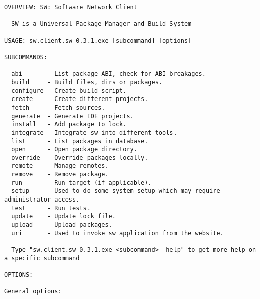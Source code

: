 \begin{verbatim}
OVERVIEW: SW: Software Network Client

  SW is a Universal Package Manager and Build System

USAGE: sw.client.sw-0.3.1.exe [subcommand] [options]

SUBCOMMANDS:

  abi       - List package ABI, check for ABI breakages.
  build     - Build files, dirs or packages.
  configure - Create build script.
  create    - Create different projects.
  fetch     - Fetch sources.
  generate  - Generate IDE projects.
  install   - Add package to lock.
  integrate - Integrate sw into different tools.
  list      - List packages in database.
  open      - Open package directory.
  override  - Override packages locally.
  remote    - Manage remotes.
  remove    - Remove package.
  run       - Run target (if applicable).
  setup     - Used to do some system setup which may require administrator access.
  test      - Run tests.
  update    - Update lock file.
  upload    - Upload packages.
  uri       - Used to invoke sw application from the website.

  Type "sw.client.sw-0.3.1.exe <subcommand> -help" to get more help on a specific subcommand

OPTIONS:

General options:


\end{verbatim}
